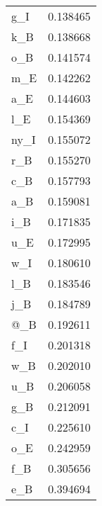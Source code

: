 \begin{tabular}{lr}
g\_I  &  0.138465 \\
k\_B  &  0.138668 \\
o\_B  &  0.141574 \\
m\_E  &  0.142262 \\
a\_E  &  0.144603 \\
l\_E  &  0.154369 \\
ny\_I &  0.155072 \\
r\_B  &  0.155270 \\
c\_B  &  0.157793 \\
a\_B  &  0.159081 \\
i\_B  &  0.171835 \\
u\_E  &  0.172995 \\
w\_I  &  0.180610 \\
l\_B  &  0.183546 \\
j\_B  &  0.184789 \\
@\_B  &  0.192611 \\
f\_I  &  0.201318 \\
w\_B  &  0.202010 \\
u\_B  &  0.206058 \\
g\_B  &  0.212091 \\
c\_I  &  0.225610 \\
o\_E  &  0.242959 \\
f\_B  &  0.305656 \\
e\_B  &  0.394694 \\
\bottomrule
\end{tabular}
